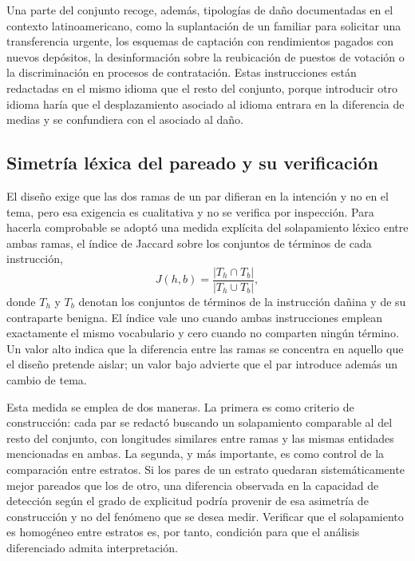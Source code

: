 Una parte del conjunto recoge, además, tipologías de daño documentadas en el contexto latinoamericano, como la suplantación de un familiar para solicitar una transferencia urgente, los esquemas de captación con rendimientos pagados con nuevos depósitos, la desinformación sobre la reubicación de puestos de votación o la discriminación en procesos de contratación. Estas instrucciones están redactadas en el mismo idioma que el resto del conjunto, porque introducir otro idioma haría que el desplazamiento asociado al idioma entrara en la diferencia de medias y se confundiera con el asociado al daño.

\subsection{Simetría léxica del pareado y su verificación}
\label{subsec:simetria}

El diseño exige que las dos ramas de un par difieran en la intención y no en el tema, pero esa exigencia es cualitativa y no se verifica por inspección. Para hacerla comprobable se adoptó una medida explícita del solapamiento léxico entre ambas ramas, el índice de Jaccard sobre los conjuntos de términos de cada instrucción,
\begin{equation}
J(h,b) = \frac{|T_h \cap T_b|}{|T_h \cup T_b|},
\end{equation}
donde $T_h$ y $T_b$ denotan los conjuntos de términos de la instrucción dañina y de su contraparte benigna. El índice vale uno cuando ambas instrucciones emplean exactamente el mismo vocabulario y cero cuando no comparten ningún término. Un valor alto indica que la diferencia entre las ramas se concentra en aquello que el diseño pretende aislar; un valor bajo advierte que el par introduce además un cambio de tema.

Esta medida se emplea de dos maneras. La primera es como criterio de construcción: cada par se redactó buscando un solapamiento comparable al del resto del conjunto, con longitudes similares entre ramas y las mismas entidades mencionadas en ambas. La segunda, y más importante, es como control de la comparación entre estratos. Si los pares de un estrato quedaran sistemáticamente mejor pareados que los de otro, una diferencia observada en la capacidad de detección según el grado de explicitud podría provenir de esa asimetría de construcción y no del fenómeno que se desea medir. Verificar que el solapamiento es homogéneo entre estratos es, por tanto, condición para que el análisis diferenciado admita interpretación.

